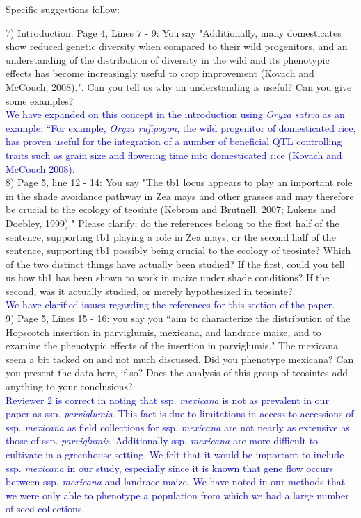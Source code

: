 \documentclass[11pt]{article}
\newcommand{\res}[1]{\noindent \textcolor{blue}{{#1}} \\}
\begin{document}
Specific suggestions follow:

7) Introduction:
Page 4, Lines 7 - 9: You say "Additionally, many domesticates show reduced genetic diversity when compared to their wild progenitors, and an understanding of the distribution of diversity in the wild and its phenotypic eﬀects has become increasingly useful to crop improvement (Kovach and McCouch, 2008).".  Can you tell us why an understanding is useful? Can you give some examples?\\

\res{We have expanded on this concept in the introduction using \emph{Oryza sativa} as an example: ``For example, \emph{Oryza rufipogon}, the wild progenitor of domesticated rice, has proven useful for the integration of a number of beneficial QTL controlling traits such as grain size and flowering time into domesticated rice (Kovach and McCouch 2008).}

8) Page 5, line 12 - 14: You say "The tb1 locus appears to play an important role in the shade avoidance pathway in Zea mays and other grasses and may therefore be crucial to the ecology of teosinte (Kebrom and Brutnell, 2007; Lukens and Doebley, 1999)." Please clarify; do the references belong to the first half of the sentence, supporting tb1 playing a role in Zea mays, or the second half of the sentence, supporting tb1 possibly being crucial to the ecology of teosinte? Which of the two distinct things have actually been studied? If the first, could you tell us how tb1 has been shown to work in maize under shade conditions? If the second, was it actually studied, or merely hypothesized in teosinte?\\ 

\res{We have clarified issues regarding the references for this section of the paper.}

9) Page 5, Lines 15 - 16: you say you ``aim to characterize the distribution of the Hopscotch insertion in parviglumis, mexicana, and landrace maize, and to examine the phenotypic eﬀects of the insertion in parviglumis."  The mexicana seem a bit tacked on and not much discussed. Did you phenotype mexicana? Can you present the data here, if so? Does the analysis of this group of teosintes add anything to your conclusions?\\

\res{Reviewer 2 is correct in noting that ssp. \emph{mexicana} is not as prevalent in our paper as ssp. \emph{parviglumis}. This fact is due to limitations in access to accessions of ssp. \emph{mexicana} as field collections for ssp. \emph{mexicana} are not nearly as extensive as those of ssp. \emph{parviglumis}. Additionally ssp. \emph{mexicana} are more difficult to cultivate in a greenhouse setting. We felt that it would be important to include ssp. \emph{mexicana} in our study, especially since it is known that gene flow occurs between ssp. \emph{mexicana} and landrace maize. We have noted in our methods that we were only able to phenotype a population from which we had a large number of seed collections.}
\end{document}
